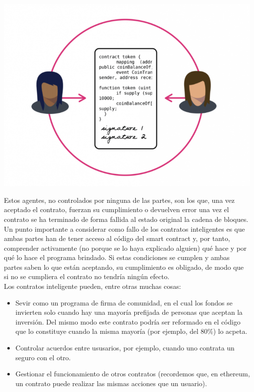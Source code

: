 \documentclass[11pt,a4paper]{article}
\begin{document}
\begin{center}
  
  \includegraphics[scale=.45]{images/smart.png}
\end{center}

Estos agentes, no controlados por ninguna de las partes, son los que, una vez aceptado el contrato, fuerzan su cumplimiento o devuelven error una vez el contrato se ha terminado de forma fallida al estado original la cadena de bloques.\\


Un punto importante a considerar como fallo de los contratos inteligentes es que ambas partes han de tener acceso al código del smart contract y, por tanto, comprender activamente (no porque se lo haya explicado alguien) qué hace y por qué lo hace el programa brindado. Si estas condiciones se cumplen y ambas partes saben lo que están aceptando, su cumplimiento es obligado, de modo que si no se cumpliera el contrato no tendría ningún efecto.\\

Los contratos inteligente pueden, entre otras muchas cosas:
\begin{itemize}
\item Sevir como un programa de firma de comunidad, en el cual los fondos se invierten solo cuando hay una mayoría prefijada de personas que aceptan la inversión. Del mismo modo este contrato podría ser reformado en el código que lo constituye cuando la misma mayoría (por ejemplo, del 80\%) lo acpeta.
\item Controlar acuerdos entre ususarios, por ejemplo, cuando uno contrata un seguro con el otro.
\item Gestionar el funcionamiento de otros contratos (recordemos que, en ethereum, un contrato puede realizar las mismas acciones que un usuario).
\end{itemize}
\end{document}

